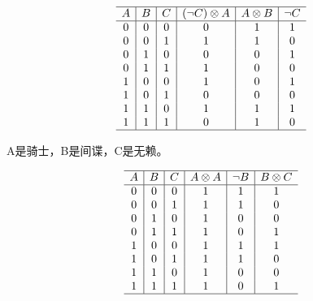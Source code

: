 {{\begin{practices}
            \begin{table}[H]
                \[
                    \begin{array}{c|c|c|c|c|c}
                        \hline
                        A & B & C & (\neg C) \otimes A & A \otimes B & \neg C \\
                        \hline
                        0 & 0 & 0 & 0 & 1 & 1 \\
                        0 & 0 & 1 & 1 & 1 & 0 \\
                        0 & 1 & 0 & 0 & 0 & 1 \\
                        0 & 1 & 1 & 1 & 0 & 0 \\
                        1 & 0 & 0 & 1 & 0 & 1 \\
                        1 & 0 & 1 & 0 & 0 & 0 \\
                        1 & 1 & 0 & 1 & 1 & 1 \\
                        1 & 1 & 1 & 0 & 1 & 0 \\
                        \hline
                   \end{array}
               \]
            \end{table}
        \end{practices}

        \begin{practices}
            A是骑士，B是间谍，C是无赖。

            \begin{table}[H]
                \[
                    \begin{array}{c|c|c|c|c|c}
                        \hline
                        A & B & C & A \otimes A & \neg B & B \otimes C \\
                        \hline
                        0 & 0 & 0 & 1 & 1 & 1 \\
                        0 & 0 & 1 & 1 & 1 & 0 \\
                        0 & 1 & 0 & 1 & 0 & 0 \\
                        0 & 1 & 1 & 1 & 0 & 1 \\
                        1 & 0 & 0 & 1 & 1 & 1 \\
                        1 & 0 & 1 & 1 & 1 & 0 \\
                        1 & 1 & 0 & 1 & 0 & 0 \\
                        1 & 1 & 1 & 1 & 0 & 1 \\
                        \hline
                   \end{array}
               \]
            \end{table}
        \end{practices}

}}
